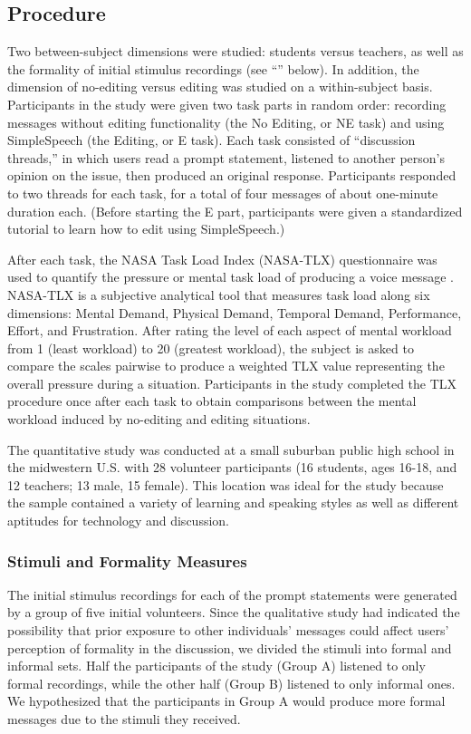 \subsection{Procedure}
Two between-subject dimensions were studied: students versus teachers, as well as the formality of initial stimulus recordings (see ``'' below).
In addition, the dimension of no-editing versus editing was studied on a within-subject basis.
Participants in the study were given two task parts in random order: recording messages without editing functionality (the No Editing, or NE task) and using SimpleSpeech (the Editing, or E task). 
Each task consisted of ``discussion threads,'' in which users read a prompt statement, listened to another person's opinion on the issue, then produced an original response.
Participants responded to two threads for each task, for a total of four messages of about one-minute duration each.
(Before starting the E part, participants were given a standardized tutorial to learn how to edit using SimpleSpeech.)

After each task, the NASA Task Load Index (NASA-TLX) questionnaire was used to quantify the pressure or mental task load of producing a voice message \cite{nasatlx}. 
NASA-TLX is a subjective analytical tool that measures task load along six dimensions: Mental Demand, Physical Demand, Temporal Demand, Performance, Effort, and Frustration. 
After rating the level of each aspect of mental workload from 1 (least workload) to 20 (greatest workload), the subject is asked to compare the scales pairwise to produce a weighted TLX value representing the overall pressure during a situation. 
Participants in the study completed the TLX procedure once after each task to obtain comparisons between the mental workload induced by no-editing and editing situations.

The quantitative study was conducted at a small suburban public high school in the midwestern U.S. with 28 volunteer participants (16 students, ages 16-18, and 12 teachers; 13 male, 15 female).
This location was ideal for the study because the sample contained a variety of learning and speaking styles as well as different aptitudes for technology and discussion. 

\subsubsection{Stimuli and Formality Measures}\label{stimuli}

The initial stimulus recordings for each of the prompt statements were generated by a group of five initial volunteers. 
Since the qualitative study had indicated the possibility that prior exposure to other individuals' messages could affect users' perception of formality in the discussion, we divided the stimuli into formal and informal sets. 
Half the participants of the study (Group A) listened to only formal recordings, while the other half (Group B) listened to only informal ones.
We hypothesized that the participants in Group A would produce more formal messages due to the stimuli they received.

